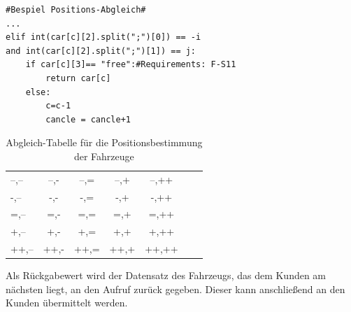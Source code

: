 \begin{lstlisting}
#Bespiel Positions-Abgleich#
...
elif int(car[c][2].split(";")[0]) == -i
and int(car[c][2].split(";")[1]) == j:
	if car[c][3]== "free":#Requirements: F-S11
    	return car[c]
    else:
        c=c-1
       	cancle = cancle+1
\end{lstlisting}
\begin{table}[h]
\centering
\label{tab.1}
\caption{Abgleich-Tabelle für die Positionsbestimmung der Fahrzeuge}
\begin{tabular}{lcccccr}
--,--&--,-&--,=&--,+&--,++\\
-,--&-,-&-,=&-,+&-,++\\
=,--&=,-&=,=&=,+&=,++\\
+,--&+,-&+,=&+,+&+,++\\
++,--&++,-&++,=&++,+&++,++\\
\end{tabular}
\end{table}
Als Rückgabewert wird der Datensatz des Fahrzeugs, das dem Kunden am nächsten liegt, an den Aufruf zurück gegeben. Dieser kann anschließend an den Kunden übermittelt werden.
